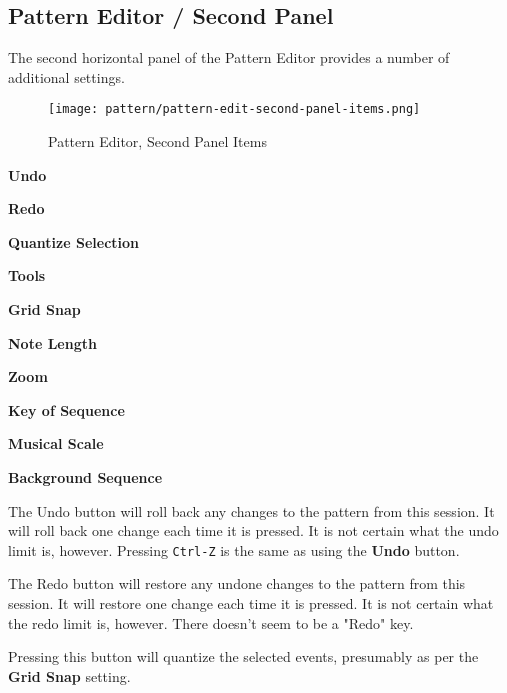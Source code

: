 \subsection{Pattern Editor / Second Panel}
\label{subsec:seq64_pattern_editor_second}

   The second horizontal panel of the Pattern Editor provides a number
   of additional settings.

\begin{figure}[H]
   \centering 
   \texttt{[image: pattern/pattern-edit-second-panel-items.png]}
   \caption{Pattern Editor, Second Panel Items}
   \label{fig:pattern_editor_main_panel_items}
\end{figure}

   \begin{enumber}
      \item \textbf{Undo}
      \item \textbf{Redo}
      \item \textbf{Quantize Selection}
      \item \textbf{Tools}
      \item \textbf{Grid Snap}
      \item \textbf{Note Length}
      \item \textbf{Zoom}
      \item \textbf{Key of Sequence}
      \item \textbf{Musical Scale}
      \item \textbf{Background Sequence}
   \end{enumber}

   \setcounter{ItemCounter}{0}      %

   The Undo button will roll back any changes to the pattern from this
   session.
   It will roll back one change each time it is pressed.
   It is not certain what the undo limit is, however.
   Pressing \texttt{Ctrl-Z} is the same as using the \textbf{Undo} button.

   The Redo button will restore any undone changes to the pattern from this
   session.
   It will restore one change each time it is pressed.
   It is not certain what the redo limit is, however.
   There doesn't seem to be a "Redo" key.

   Pressing this button will quantize the selected events, presumably as per
   the \textbf{Grid Snap} setting.


